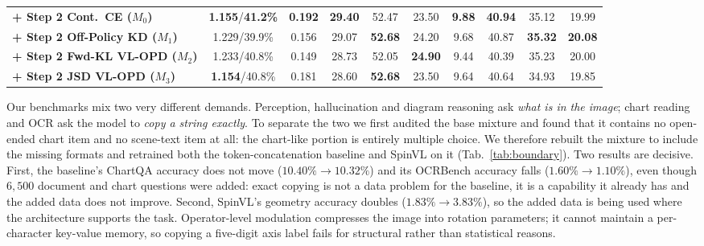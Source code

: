 \documentclass[10pt,twocolumn,letterpaper]{article}
\newcommand{\modelname}{SpinVL}
\begin{document}
\begin{table}[t]
{\begin{tabular}{@{}lccccccccc@{}}
\textbf{+ Step 2 Cont.\ CE ($M_0$)}              & \textbf{1.155}/\textbf{41.2\%} & \textbf{0.192} & \textbf{29.40} & 52.47 & 23.50 & \textbf{9.88} & \textbf{40.94} & 35.12 & 19.99 \\
\textbf{+ Step 2 Off-Policy KD ($M_1$)}          & 1.229/39.9\% & 0.156 & 29.07 & \textbf{52.68} & 24.20 & 9.68 & 40.87 & \textbf{35.32} & \textbf{20.08} \\
\textbf{+ Step 2 Fwd-KL VL-OPD ($M_2$)}          & 1.233/40.8\% & 0.149 & 28.73 & 52.05 & \textbf{24.90} & 9.44 & 40.39 & 35.23 & 20.00 \\
\textbf{+ Step 2 JSD VL-OPD ($M_3$)}             & \textbf{1.154}/40.8\% & 0.181 & 28.60 & \textbf{52.68} & 23.50 & 9.64 & 40.64 & 34.93 & 19.85 \\
\bottomrule
\end{tabular}}
\end{table}

Our benchmarks mix two very different demands. Perception, hallucination and
diagram reasoning ask \emph{what is in the image}; chart reading and OCR ask
the model to \emph{copy a string exactly}. To separate the two we first audited
the base mixture and found that it contains no open-ended chart item and no
scene-text item at all: the chart-like portion is entirely multiple choice.
We therefore rebuilt the mixture to include the missing formats and retrained
both the token-concatenation baseline and \modelname{} on it
(Tab.~\ref{tab:boundary}). Two results are decisive. First, the baseline's
ChartQA accuracy does not move ($10.40\%\to10.32\%$) and its OCRBench accuracy
falls ($1.60\%\to1.10\%$), even though $6{,}500$ document and chart questions
were added: exact copying is not a data problem for the baseline, it is a
capability it already has and the added data does not improve. Second,
\modelname{}'s geometry accuracy doubles ($1.83\%\to3.83\%$), so the added data
is being used where the architecture supports the task. Operator-level
modulation compresses the image into rotation parameters; it cannot maintain a
per-character key-value memory, so copying a five-digit axis label fails for
structural rather than statistical reasons.
\end{document}
